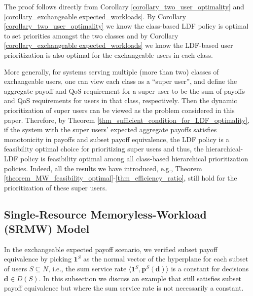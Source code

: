 \documentclass[prodmode,acmtompecs]{acmsmall}
\newcommand{\fullUserSet}{N}
\newcommand{\myComments}[1]{}
\newif\ifdissertation
\newcommand{\dissertationStart}{\ifdissertation  \myComments{Dissertation version: }}
\begin{document}
The proof follows directly from Corollary \ref{corollary_two_user_optimality} and \ref{corollary_exchangeable expected_workloads}. By Corollary \ref{corollary_two_user_optimality} we know the class-based LDF policy is optimal to set priorities amongst the two classes and by Corollary \ref{corollary_exchangeable expected_workloads} we know the LDF-based user prioritization is also optimal for the exchangeable users in each class. 

More generally, for systems serving multiple (more than two) classes of exchangeable users, 
one can view each class as a ``super user'', and define the aggregate payoff and QoS requirement for a super user to be the sum of payoffs and QoS requirements for users in that class, respectively. 
Then the dynamic prioritization of super users can be viewed as the problem considered in this paper. Therefore, by Theorem \ref{thm_sufficient_condition_for_LDF_optimality}, if the system with the super users' expected aggregate payoffs satisfies monotonicity in payoffs and subset payoff equivalence, the LDF policy is a feasibility optimal choice for prioritizing super users and thus, the hierarchical-LDF policy is feasibility optimal among all class-based hierarchical prioritization policies. 
Indeed, all the results we have introduced, e.g., Theorem \ref{theorem_MW_feasibility_optimal}-\ref{thm_efficiency_ratio}, still hold for the prioritization of these super users. 

\dissertationStart
\subsection{Single-Resource Memoryless-Workload (SRMW) Model}

In the exchangeable expected payoff scenario, we verified subset payoff equivalence by picking $\mathbf{1}^S$ as the normal vector of the hyperplane for each subset of users $S\subseteq \fullUserSet$, i.e., the sum service rate $\langle \mathbf{1}^S, \mathbf{p}^S(\mathbf{d}) \rangle$ is a constant for decisions $\mathbf{d} \in D(S)$. In this subsection we discuss an example that still satisfies subset payoff equivalence but where the sum service rate is not necessarily a constant. 
\end{document}
